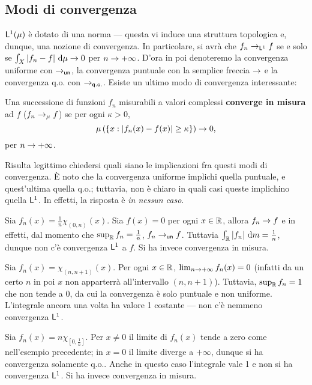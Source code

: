 \documentclass[Completo.tex]{subfiles}
\begin{document}
\subsection{Modi di convergenza}
$\sf[L]^1(\mu)$ è dotato di una norma --- questa vi induce una struttura topologica e, dunque, una nozione di convergenza. In particolare, si avrà che $f_n \ra_{\sf[L]^1} f$ se e solo se $\int_X \vert f_n - f \vert \ \mathrm{d}\mu \rightarrow 0$ per $n \rightarrow +\infty$. D'ora in poi denoteremo la convergenza uniforme con $\ra_{\sf[un]}$, la convergenza puntuale con la semplice freccia $\rightarrow$ e la convergenza q.o. con $\ra_{\sf[q.o.]}$. Esiste un ultimo modo di convergenza interessante:
\begin{Def}
	Una successione di funzioni $f_n$ misurabili a valori complessi \textbf{converge in misura} ad $f$ ($f_n \rightarrow_{\mu} f$) se per ogni $\kappa > 0$,
	\begin{equation*}
	\mu\left(\{x: \vert f_n(x) - f(x) \vert \geq \kappa\}\right) \rightarrow 0,
	\end{equation*}
	per $n \rightarrow +\infty$.
\end{Def}
 Risulta legittimo chiedersi quali siano le implicazioni fra questi modi di convergenza. È noto che la convergenza uniforme implichi quella puntuale, e quest'ultima quella q.o.; tuttavia, non è chiaro in quali casi queste implichino quella $\sf[L]^1$. In effetti, la risposta è \textit{in nessun caso}.
\begin{Ex}
	Sia $f_n(x) = \frac{1}{n} \chi_{(0,n)}(x)$. Sia $f(x) = 0$ per ogni $x \in \bb[R]$, allora $f_n \rightarrow f$ e in effetti, dal momento che $\sup_{\bb[R]} f_n = \frac{1}{n}$, $f_n \ra_{\sf[un]} f$. Tuttavia $\int_{\bb[R]} \vert f_n \vert \ \mathrm{d}m = \frac{1}{n}$, dunque non c'è convergenza $\sf[L]^1$ a $f$. Si ha invece convergenza in misura.
\end{Ex}
\begin{Ex}
	Sia $f_n(x) = \chi_{(n, n+1)}(x)$. Per ogni $x \in \bb[R]$, $\lim_{n \rightarrow +\infty} f_n(x) = 0$ (infatti da un certo $n$ in poi $x$ non apparterrà all'intervallo $(n, n+1)$). Tuttavia, $\sup_{\bb[R]} f_n = 1$ che non tende a 0, da cui la convergenza è solo puntuale e non uniforme. L'integrale ancora una volta ha valore 1 costante --- non c'è nemmeno convergenza $\sf[L]^1$.
\end{Ex}
\begin{Ex}
	Sia $f_n(x) = n \chi_{[0, \frac{1}{n}]}$.  Per $x \neq 0$ il limite di $f_n(x)$ tende a zero come nell'esempio precedente; in $x = 0$ il limite diverge a $+\infty$, dunque si ha convergenza solamente q.o.. Anche in questo caso l'integrale vale 1 e non si ha convergenza $\sf[L]^1$. Si ha invece convergenza in misura.
\end{Ex}
\end{document}
